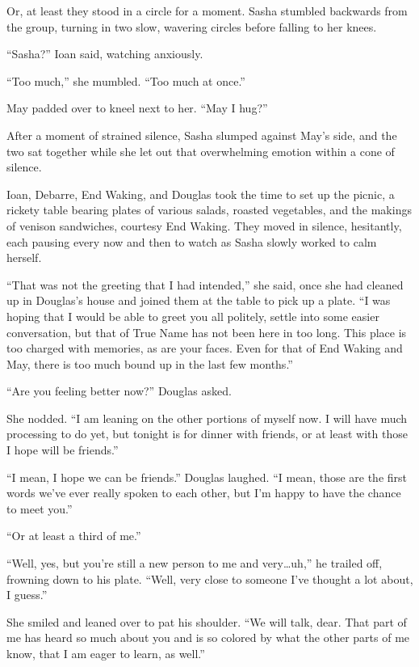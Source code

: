 Or, at least they stood in a circle for a moment. Sasha stumbled backwards from the group, turning in two slow, wavering circles before falling to her knees.

``Sasha?'' Ioan said, watching anxiously.

``Too much,'' she mumbled. ``Too much at once.''

May padded over to kneel next to her. ``May I hug?''

After a moment of strained silence, Sasha slumped against May's side, and the two sat together while she let out that overwhelming emotion within a cone of silence.

Ioan, Debarre, End Waking, and Douglas took the time to set up the picnic, a rickety table bearing plates of various salads, roasted vegetables, and the makings of venison sandwiches, courtesy End Waking. They moved in silence, hesitantly, each pausing every now and then to watch as Sasha slowly worked to calm herself.

``That was not the greeting that I had intended,'' she said, once she had cleaned up in Douglas's house and joined them at the table to pick up a plate. ``I was hoping that I would be able to greet you all politely, settle into some easier conversation, but that of True Name has not been here in too long. This place is too charged with memories, as are your faces. Even for that of End Waking and May, there is too much bound up in the last few months.''

``Are you feeling better now?'' Douglas asked.

She nodded. ``I am leaning on the other portions of myself now. I will have much processing to do yet, but tonight is for dinner with friends, or at least with those I hope will be friends.''

``I mean, I hope we can be friends.'' Douglas laughed. ``I mean, those are the first words we've ever really spoken to each other, but I'm happy to have the chance to meet you.''

``Or at least a third of me.''

``Well, yes, but you're still a new person to me and very\ldots uh,'' he trailed off, frowning down to his plate. ``Well, very close to someone I've thought a lot about, I guess.''

She smiled and leaned over to pat his shoulder. ``We will talk, dear. That part of me has heard so much about you and is so colored by what the other parts of me know, that I am eager to learn, as well.''

